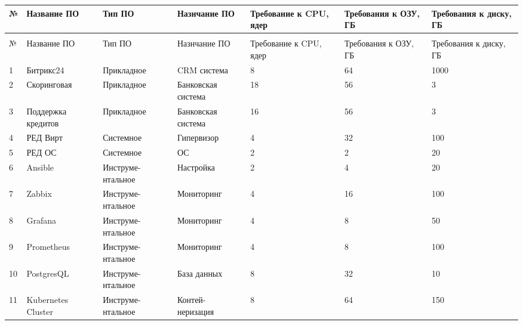 \documentclass[14pt, a4paper]{extarticle}
\begin{document}
\begin{tabularx}{\textwidth}{|l|X|X|X|X|X|X|}
  \caption{Общие системные требования\label{tab:summary-system-requirements}}                                                                \\
  \hline
  №  & Название ПО        & Тип ПО             & Назнчание ПО       & Требование к CPU, ядер & Требования к ОЗУ, ГБ & Требования к диску, ГБ \\ \hline
  \endfirsthead
  \caption*{Продолжение таблицы~\ref{tab:summary-system-requirements}}                                                                       \\
  \hline
  №  & Название ПО        & Тип ПО             & Назнчание ПО       & Требование к CPU, ядер & Требования к ОЗУ, ГБ & Требования к диску, ГБ \\ \hline
  \endhead
  \endfoot
  \endlastfoot

  1  & Битрикс24          & Прикладное         & CRM система        & 8                      & 64                   & 1000                   \\ \hline
  2  & Скоринговая        & Прикладное         & Банковская система & 18                     & 56                   & 3                      \\ \hline
  3  & Поддержка кредитов & Прикладное         & Банковская система & 16                     & 56                   & 3                      \\ \hline
  4  & РЕД Вирт           & Системное          & Гипервизор         & 4                      & 32                   & 100                    \\ \hline
  5  & РЕД ОС             & Системное          & ОС                 & 2                      & 2                    & 20                     \\ \hline
  6  & Ansible            & Инструме- нтальное & Настройка          & 2                      & 4                    & 20                     \\ \hline
  7  & Zabbix             & Инструме- нтальное & Мониторинг         & 4                      & 16                   & 100                    \\ \hline
  8  & Grafana            & Инструме- нтальное & Мониторинг         & 4                      & 8                    & 50                     \\ \hline
  9  & Prometheus         & Инструме- нтальное & Мониторинг         & 4                      & 8                    & 100                    \\ \hline
  10 & PostgresQL         & Инструме- нтальное & База данных        & 8                      & 32                   & 10                     \\ \hline
  11 & Kubernetes Cluster & Инструме- нтальное & Контей- неризация  & 8                      & 64                   & 150                    \\ \hline
\end{tabularx}
\end{document}
